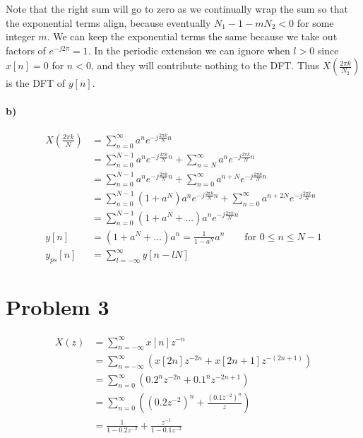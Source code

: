 \documentclass[12pt]{article}
\begin{document}
Note that the right sum will go to zero as we continually wrap the sum so that the exponential terms align, because eventually \(N_1-1-mN_2<0\) for some
integer \(m\). We can keep the exponential terms the same because we take out factors of \(e^{-j2\pi}=1\). In the periodic extension we can
ignore when \(l>0\) since \(x[n]=0\) for \(n<0\), and they will contribute nothing to the DFT. Thus \(X\left(\frac{2\pi k}{N_2}\right)\) is the
DFT of \(y[n]\).

\paragraph{b)}

\begin{align*}
    X\left(\frac{2\pi k}{N}\right)&= \sum_{n=0}^\infty a^n e^{-j\frac{2\pi k}{N} n}\\
    &=\sum_{n=0}^{N-1} a^n e^{-j\frac{2\pi k}{N} n} + \sum_{n=N}^\infty a^n e^{-j\frac{2\pi k}{N} n}\\
    &=\sum_{n=0}^{N-1} a^n e^{-j\frac{2\pi k}{N} n} + \sum_{n=0}^\infty a^{n+N} e^{-j\frac{2\pi k}{N} n}\\
    &=\sum_{n=0}^{N-1} (1+a^N)a^n e^{-j\frac{2\pi k}{N} n} + \sum_{n=0}^\infty a^{n+2N} e^{-j\frac{2\pi k}{N} n}\\
    &=\sum_{n=0}^{N-1} (1+a^N+\ldots)a^n e^{-j\frac{2\pi k}{N} n}\\
    y[n]&=(1+a^N+\ldots)a^n=\frac{1}{1-a^N}a^n\qquad \text{for } 0\leq n \leq N-1\\
    y_{ps}[n]&=\sum_{l=-\infty}^{\infty}y[n-lN]
\end{align*}

\section*{Problem 3}

\begin{align*}
    X(z) &= \sum_{n=-\infty}^\infty x[n] z^{-n}\\
    &= \sum_{n=-\infty}^\infty (x[2n] z^{-2n} + x[2n + 1] z^{-(2n+1)})\\
    &= \sum_{n=0}^\infty (0.2^nz^{-2n} + 0.1^n z^{-2n+1})\\
    &= \sum_{n=0}^\infty \left(\left(0.2z^{-2}\right)^n + \frac{\left(0.1z^{-2}\right)^n}{z}\right)\\
    &=\frac{1}{1-0.2z^{-2}} + \frac{z^{-1}}{1-0.1z^{-2}}
\end{align*}
\end{document}
